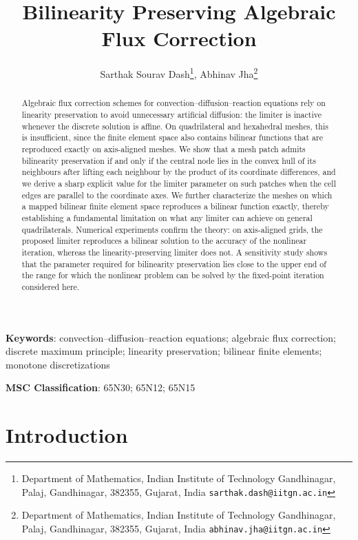 \documentclass[a4paper]{article}
\title{Bilinearity Preserving Algebraic Flux Correction}
\author{Sarthak Sourav Dash\footnote{Department of Mathematics, Indian Institute of Technology Gandhinagar, Palaj, Gandhinagar, 382355, Gujarat, India \texttt{sarthak.dash@iitgn.ac.in}}, Abhinav Jha\footnote{Department of Mathematics, Indian Institute of Technology Gandhinagar, Palaj, Gandhinagar, 382355, Gujarat, India \texttt{abhinav.jha@iitgn.ac.in}}}
\date{}
\theoremstyle{plain}
\theoremstyle{definition}
\theoremstyle{remark}
\begin{document}
\maketitle

\begin{abstract}
Algebraic flux correction schemes for convection--diffusion--reaction equations rely on linearity preservation to avoid unnecessary artificial diffusion: the limiter is inactive whenever the discrete solution is affine. On quadrilateral and hexahedral meshes, this is insufficient, since the finite element space also contains bilinear functions that are reproduced exactly on axis-aligned meshes. We show that a mesh patch admits bilinearity preservation if and only if the central node lies in the convex hull of its neighbours after lifting each neighbour by the product of its coordinate differences, and we derive a sharp explicit value for the limiter parameter on such patches when the cell edges are parallel to the coordinate axes.  We further characterize the meshes on which a mapped bilinear finite element space reproduces a bilinear function exactly, thereby establishing a fundamental limitation on what any limiter can achieve on general quadrilaterals. Numerical experiments confirm the theory: on axis-aligned grids, the proposed limiter reproduces a bilinear solution to the accuracy of the nonlinear iteration, whereas the linearity-preserving limiter does not. A sensitivity study shows that the parameter required for bilinearity preservation lies close to the upper end of the range for which the nonlinear problem can be solved by the fixed-point iteration considered here.
\end{abstract}

\textbf{Keywords}: convection--diffusion--reaction equations; algebraic flux correction; discrete maximum principle; linearity preservation; bilinear finite elements; monotone discretizations

\textbf{MSC Classification}: 65N30; 65N12; 65N15


\section{Introduction}
\end{document}
